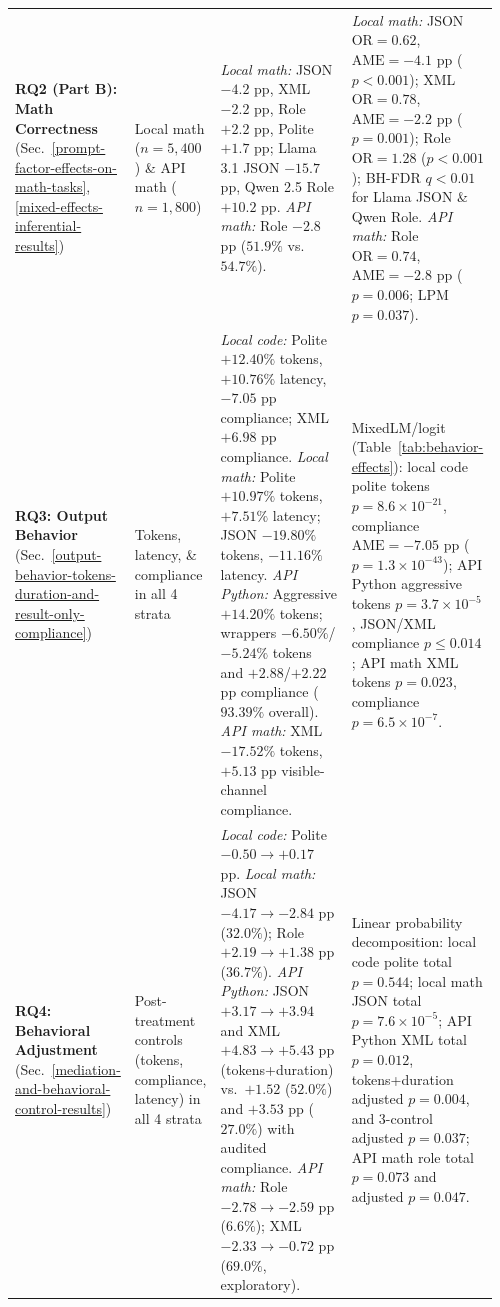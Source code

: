 \documentclass[a4paper,fleqn]{cas-sc}
\begin{document}
\begin{table}[htbp]
\begin{tabular}{@{}p{0.15\linewidth}p{0.18\linewidth}p{0.31\linewidth}p{0.32\linewidth}@{}}
\addlinespace[3pt]
\textbf{RQ2 (Part B): Math Correctness} \newline (Sec.~\ref{prompt-factor-effects-on-math-tasks}, \ref{mixed-effects-inferential-results}) & Local math ($n = 5,400$) \& API math ($n = 1,800$) & \emph{Local math:} JSON $-4.2$ pp, XML $-2.2$ pp, Role $+2.2$ pp, Polite $+1.7$ pp; Llama 3.1 JSON $-15.7$ pp, Qwen 2.5 Role $+10.2$ pp. \newline \emph{API math:} Role $-2.8$ pp ($51.9\%$ vs.\ $54.7\%$). & \emph{Local math:} JSON $\text{OR} = 0.62$, $\text{AME} = -4.1$ pp ($p < 0.001$); XML $\text{OR} = 0.78$, $\text{AME} = -2.2$ pp ($p = 0.001$); Role $\text{OR} = 1.28$ ($p < 0.001$); BH-FDR $q < 0.01$ for Llama JSON \& Qwen Role. \newline \emph{API math:} Role $\text{OR} = 0.74$, $\text{AME} = -2.8$ pp ($p = 0.006$; LPM $p = 0.037$). \\
\addlinespace[3pt]
\textbf{RQ3: Output Behavior} \newline (Sec.~\ref{output-behavior-tokens-duration-and-result-only-compliance}) & Tokens, latency, \& compliance in all 4 strata & \emph{Local code:} Polite $+12.40\%$ tokens, $+10.76\%$ latency, $-7.05$ pp compliance; XML $+6.98$ pp compliance. \emph{Local math:} Polite $+10.97\%$ tokens, $+7.51\%$ latency; JSON $-19.80\%$ tokens, $-11.16\%$ latency. \emph{API Python:} Aggressive $+14.20\%$ tokens; wrappers $-6.50\%$/$-5.24\%$ tokens and $+2.88$/$+2.22$ pp compliance ($93.39\%$ overall). \emph{API math:} XML $-17.52\%$ tokens, $+5.13$ pp visible-channel compliance. & MixedLM/logit (Table~\ref{tab:behavior-effects}): local code polite tokens $p = 8.6 \times 10^{-21}$, compliance $\text{AME} = -7.05$ pp ($p = 1.3 \times 10^{-43}$); API Python aggressive tokens $p = 3.7 \times 10^{-5}$, JSON/XML compliance $p \le 0.014$; API math XML tokens $p = 0.023$, compliance $p = 6.5 \times 10^{-7}$. \\
\addlinespace[3pt]
\textbf{RQ4: Behavioral Adjustment} \newline (Sec.~\ref{mediation-and-behavioral-control-results}) & Post-treatment controls (tokens, compliance, latency) in all 4 strata & \emph{Local code:} Polite $-0.50 \to +0.17$ pp. \emph{Local math:} JSON $-4.17 \to -2.84$ pp ($32.0\%$); Role $+2.19 \to +1.38$ pp ($36.7\%$). \emph{API Python:} JSON $+3.17 \to +3.94$ and XML $+4.83 \to +5.43$ pp (tokens+duration) vs.\ $+1.52$ ($52.0\%$) and $+3.53$ pp ($27.0\%$) with audited compliance. \emph{API math:} Role $-2.78 \to -2.59$ pp ($6.6\%$); XML $-2.33 \to -0.72$ pp ($69.0\%$, exploratory). & Linear probability decomposition: local code polite total $p = 0.544$; local math JSON total $p = 7.6 \times 10^{-5}$; API Python XML total $p = 0.012$, tokens+duration adjusted $p = 0.004$, and 3-control adjusted $p = 0.037$; API math role total $p = 0.073$ and adjusted $p = 0.047$. \\

\end{tabular}
\end{table}
\end{document}
